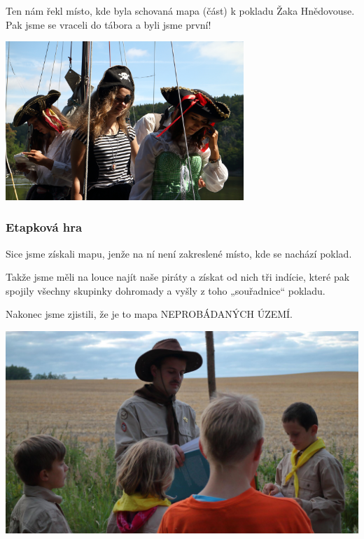 Ten nám řekl místo, kde byla schovaná mapa (část) k pokladu Žaka Hnědovouse. Pak jsme se vraceli do tábora a byli jsme první!

\begin{center}
	\includegraphics[width=9cm]{img/anpetu_tabor/pirati.JPG}
\end{center}


\subsubsection{Etapková hra} %
\label{ssub:etapková_hra1}

Sice jsme získali mapu, jenže na ní není zakreslené místo, kde se nachází poklad.

Takže jsme měli na louce najít naše piráty a získat od nich tři indície, které pak spojily všechny skupinky dohromady a vyšly z toho „souřadnice“ pokladu.



Nakonec jsme zjistili, že je to mapa NEPROBÁDANÝCH ÚZEMÍ.

\begin{center}
	\includegraphics[width=11
	cm]{img/anpetu_tabor/svojsik.jpg}
\end{center}

